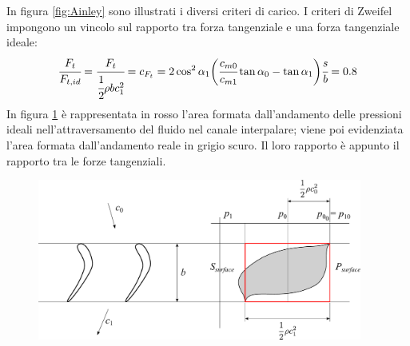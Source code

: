 In figura \ref{fig:Ainley} sono illustrati i diversi criteri di carico. I criteri di Zweifel impongono un vincolo sul rapporto tra forza tangenziale e una forza tangenziale ideale:
\begin{align*}
\cfrac{F_t}{F_{t,id}} = \cfrac{F_t}{\cfrac{1}{2} \rho b c_1^2} = c_{F_t} = 2 \cos^2 \alpha_1 \bigg(\cfrac{c_{m0}}{c_{m1}} \tan \alpha_0 - \tan \alpha_1 \bigg) \cfrac{s}{b} = 0.8
\end{align*}
In figura \ref{fig:CritCaricoT} è rappresentata in rosso l'area formata dall'andamento delle pressioni ideali nell'attraversamento del fluido nel canale interpalare; viene poi evidenziata l'area formata dall'andamento reale in grigio scuro. Il loro rapporto è appunto il rapporto tra le forze tangenziali.
\begin{figure}[h!]
\centering
  \includegraphics[width=0.95\textwidth]{fig/CritCaricoT.pdf}
\caption{}
\label{fig:CritCaricoT}
\end{figure}